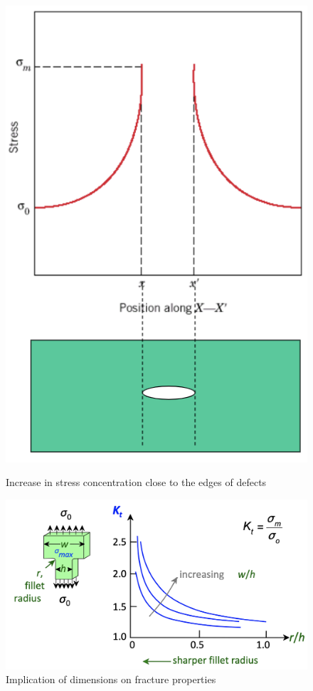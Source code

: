 \begin{figure}[ht]
  \centering
  \begin{minipage}{0.33\linewidth}
    \centering
    \includegraphics[width=\linewidth]{./figures/f9_6.png}
    \caption{Increase in stress concentration close to the edges of defects}
    \label{fig:f9_6}
  \end{minipage}
  \hfill
  \begin{minipage}{0.65\linewidth}
    \centering
    \includegraphics[width=\linewidth]{./figures/f9_7.png}
    \caption{Implication of dimensions on fracture properties}
    \label{fig:f9_7}
  \end{minipage}
\end{figure}

